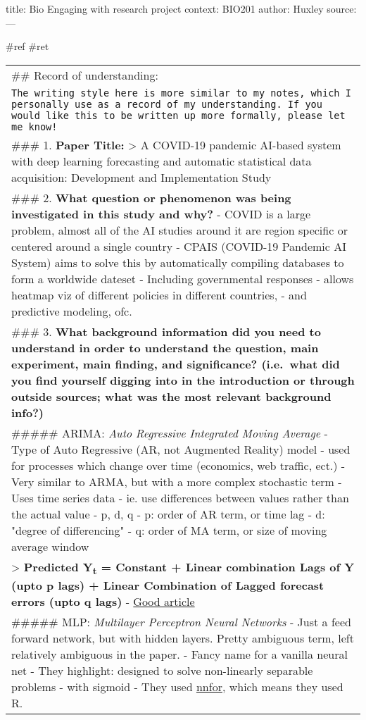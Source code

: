 \documentclass[letterpaper]{article}
\date{\today}
\title{}
\begin{document}
title: Bio Engaging with research project context: BIO201 author: Huxley
source: ---

\#ref \#ret

\begin{center}
\begin{tabular}{l}
\#\# Record of understanding:\\
\texttt{The writing style here is more similar to my notes, which I personally use as a record of my understanding. If you would like this to be written up more formally, please let me know!}\\
\#\#\# 1. \textbf{Paper Title:} > A COVID-19 pandemic AI-based system with deep learning forecasting and automatic statistical data acquisition: Development and Implementation Study\\
\#\#\# 2. \textbf{What question or phenomenon was being investigated in this study and why?} - COVID is a large problem, almost all of the AI studies around it are region specific or centered around a single country - CPAIS (COVID-19 Pandemic AI System) aims to solve this by automatically compiling databases to form a worldwide dateset - Including governmental responses - allows heatmap viz of different policies in different countries, - and predictive modeling, ofc.\\
\#\#\# 3. \textbf{What background information did you need to understand in order to understand the question, main experiment, main finding, and significance? (i.e. what did you find yourself digging into in the introduction or through outside sources; what was the most relevant background info?)}\\
\#\#\#\#\# ARIMA: \emph{Auto Regressive Integrated Moving Average} - Type of Auto Regressive (AR, not Augmented Reality) model - used for processes which change over time (economics, web traffic, ect.) - Very similar to ARMA, but with a more complex stochastic term - Uses time series data - ie. use differences between values rather than the actual value - p, d, q - p: order of AR term, or time lag - d: "degree of differencing" - q: order of MA term, or size of moving average window\\
> \textbf{Predicted Y\textsubscript{t} = Constant + Linear combination Lags of Y (upto p lags) + Linear Combination of Lagged forecast errors (upto q lags)} - \href{https://www.machinelearningplus.com/time-series/arima-model-time-series-forecasting-python}{Good article}\\
\#\#\#\#\# MLP: \emph{Multilayer Perceptron Neural Networks} - Just a feed forward network, but with hidden layers. Pretty ambiguous term, left relatively ambiguous in the paper. - Fancy name for a vanilla neural net - They highlight: designed to solve non-linearly separable problems - with sigmoid - They used \href{https://github.com/trnnick/nnfor}{nnfor}, which means they used R.\\

\end{tabular}
\end{center}
\end{document}
